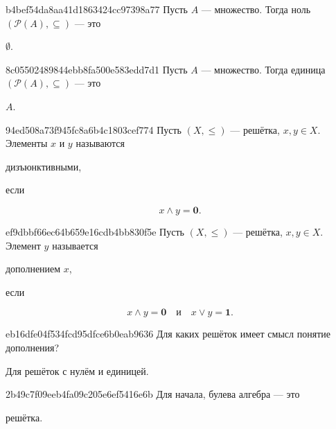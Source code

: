 \begin{note}{b4bef54da8aa41d1863424cc97398a77}
    Пусть \({ A }\) --- множество.
    Тогда ноль \({ (\mathcal P(A), \subseteq) }\) --- это \begin{icloze}{1}\({ \emptyset }\).\end{icloze}
\end{note}

\begin{note}{8c05502489844ebb8fa500e583edd7d1}
    Пусть \({ A }\) --- множество.
    Тогда единица \({ (\mathcal P(A), \subseteq) }\) --- это \begin{icloze}{1}\({ A }\).\end{icloze}
\end{note}

\begin{note}{94ed508a73f945fc8a6b4c1803cef774}
    Пусть \({ (X, \leqslant) }\) --- решётка,\: \({ x, y \in X }\).
    Элементы \({ x }\) и \({ y }\) называются \begin{icloze}{2}дизъюнктивными,\end{icloze} если
    \begin{icloze}{1}
        \[
            x \land y = \mathbf{0}.
        \]
    \end{icloze}
\end{note}

\begin{note}{ef9dbbf66ec64b659e16cdb4bb830f5e}
    Пусть \({ (X, \leqslant) }\) --- решётка,\: \({ x, y \in X }\).
    Элемент \({ y }\) называется \begin{icloze}{2}дополнением \({ x }\),\end{icloze} если
    \begin{icloze}{1}
        \[
            x \land y = \mathbf{0} \quad \text{и} \quad x \lor y = \mathbf{1}.
        \]
    \end{icloze}
\end{note}

\begin{note}{eb16dfe04f534fcd95dfce6b0eab9636}
    Для каких решёток имеет смысл понятие дополнения?

    \begin{cloze}{1}
        Для решёток с нулём и единицей.
    \end{cloze}
\end{note}

\begin{note}{2b49c7f09eeb4fa09c205e6ef5416e6b}
    Для начала, булева алгебра --- это \begin{icloze}{1}решётка.\end{icloze}
\end{note}

